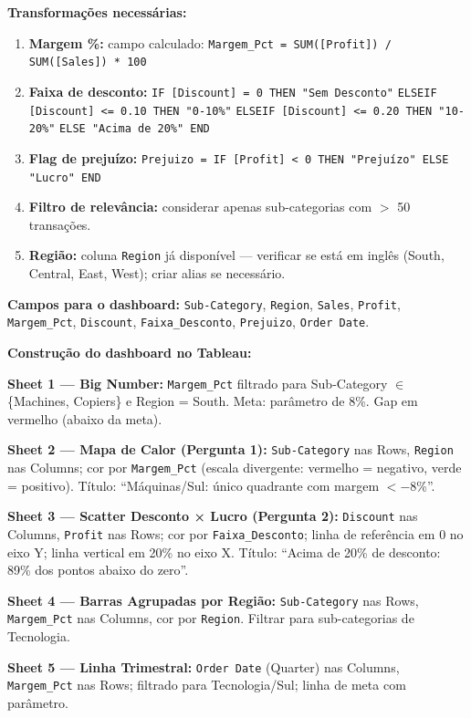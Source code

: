 \begin{SolvedBox}
\textbf{Transformações necessárias:}

\begin{enumerate}
  \item \textbf{Margem \%:} campo calculado: \texttt{Margem\_Pct = SUM([Profit]) / SUM([Sales]) * 100}
  \item \textbf{Faixa de desconto:}
  \texttt{IF [Discount] = 0 THEN "Sem Desconto"}
  \texttt{ELSEIF [Discount] <= 0.10 THEN "0-10\%"}
  \texttt{ELSEIF [Discount] <= 0.20 THEN "10-20\%"}
  \texttt{ELSE "Acima de 20\%" END}
  \item \textbf{Flag de prejuízo:} \texttt{Prejuizo = IF [Profit] < 0 THEN "Prejuízo" ELSE "Lucro" END}
  \item \textbf{Filtro de relevância:} considerar apenas sub-categorias com $>$ 50 transações.
  \item \textbf{Região:} coluna \texttt{Region} já disponível — verificar se está em inglês
  (South, Central, East, West); criar alias se necessário.
\end{enumerate}

\textbf{Campos para o dashboard:} \texttt{Sub-Category}, \texttt{Region}, \texttt{Sales},
\texttt{Profit}, \texttt{Margem\_Pct}, \texttt{Discount}, \texttt{Faixa\_Desconto},
\texttt{Prejuizo}, \texttt{Order Date}.
\end{SolvedBox}

\begin{SolvedBox}
\textbf{Construção do dashboard no Tableau:}

\textbf{Sheet 1 — Big Number:} \texttt{Margem\_Pct} filtrado para
Sub-Category $\in$ \{Machines, Copiers\} e Region = South. Meta: parâmetro de 8\%.
Gap em vermelho (abaixo da meta).

\textbf{Sheet 2 — Mapa de Calor (Pergunta 1):}
\texttt{Sub-Category} nas Rows, \texttt{Region} nas Columns; cor por
\texttt{Margem\_Pct} (escala divergente: vermelho = negativo, verde = positivo).
Título: ``Máquinas/Sul: único quadrante com margem $< -$8\%''.

\textbf{Sheet 3 — Scatter Desconto × Lucro (Pergunta 2):}
\texttt{Discount} nas Columns, \texttt{Profit} nas Rows; cor por \texttt{Faixa\_Desconto};
linha de referência em 0 no eixo Y; linha vertical em 20\% no eixo X.
Título: ``Acima de 20\% de desconto: 89\% dos pontos abaixo do zero''.

\textbf{Sheet 4 — Barras Agrupadas por Região:}
\texttt{Sub-Category} nas Rows, \texttt{Margem\_Pct} nas Columns, cor por \texttt{Region}.
Filtrar para sub-categorias de Tecnologia.

\textbf{Sheet 5 — Linha Trimestral:}
\texttt{Order Date} (Quarter) nas Columns, \texttt{Margem\_Pct} nas Rows;
filtrado para Tecnologia/Sul; linha de meta com parâmetro.
\end{SolvedBox}

